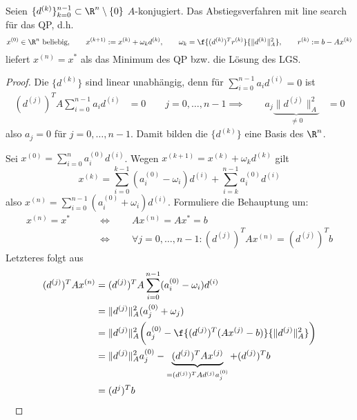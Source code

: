 \documentclass[11pt]{scrbook}
\begin{document}
\begin{st}[Konvergenz] \label{4.17}
	Seien $\{d^{(k)}\}_{k=0}^{n-1} \subset \R^n \setminus \{0\}$ $A$-konjugiert.
	Das Abstiegsverfahren mit line search für das QP, d.h.
	\[
		x^{(0)} \in \R^n \text{ beliebig},
		\qquad x^{(k+1)} := x^{(k)} + \omega_k d^{(k)},
		\qquad \omega_k = \f{(d^{(k)})^T r^{(k)}}{\|d^{(k)}\|_A^2},
		\qquad r^{(k)} := b - Ax^{(k)}
	\]
	liefert $x^{(n)} = x^*$ als das Minimum des QP bzw. die Lösung des LGS.
	\begin{proof}
		Die $\{d^{(k)}\}$ sind linear unabhängig, denn für $\sum_{i=0}^{n-1} a_i d^{(i)} = 0$ ist
		\begin{align*}
			(d^{(j)})^T A \sum_{i=0}^{n-1} a_i d^{(i)} &= 0  \qquad j= 0, \dotsc, n-1
			\implies \qquad a_j \underbrace{\|d^{(j)}\|_A^2}_{\neq 0} &= 0 
		\end{align*}
		also $a_j = 0$ für $j=0,\dotsc,n-1$.
		Damit bilden die $\{d^{(k)}\}$ eine Basis des $\R^n$.

		Sei $x^{(0)} = \sum_{i=0}^n a_i^{(0)} d^{(i)}$.
		Wegen $x^{(k+1)} = x^{(k)} + \omega_k d^{(k)}$ gilt
		\[
			x^{(k)} = \sum_{i=0}^{k-1} (a_i^{(0)} - \omega_i)d^{(i)} + \sum_{i=k}^{n-1} a_i^{(0)} d^{(i)}
		\]
		also $x^{(n)} = \sum_{i=0}^{n-1} (a_i^{(0)}+\omega_i) d^{(i)}$.
		Formuliere die Behauptung um:
		\begin{align*}
			x^{(n)} = x^* \qquad &\iff \qquad Ax^{(n)} = A x^{*} = b \\
			\qquad &\iff \qquad \forall j=0,\dotsc,n-1 : (d^{(j)})^T A x^{(n)} = (d^{(j)})^T b
		\end{align*}
		Letzteres folgt aus
		\begin{align*}
			(d^{(j)})^T A x^{(n)} 
			&= (d^{(j)})^T A \sum_{i=0}^{n-1} (a_i^{(0)}-\omega_i) d^{(i)} \\
			&= \|d^{(j)}\|_A^2 (a_j^{(0)}+\omega_j) \\
			&= \|d^{(j)}\|_A^2 \bigg( a_j^{(0)} - \f{(d^{(j)})^T (Ax^{(j)}-b)}{\|d^{(j)}\|_A^2} \bigg)\\
			&= \|d^{(j)}\|_A^2 a_j^{(0)} - \underbrace{(d^{(j)})^T Ax^{(j)}}_{= (d^{(j)})^T A d^{(j)}a_j^{(0)}} + (d^{(j)})^T b \\
			&= (d^{j})^T b
		\end{align*}~
	\end{proof}
\end{st}
\end{document}
